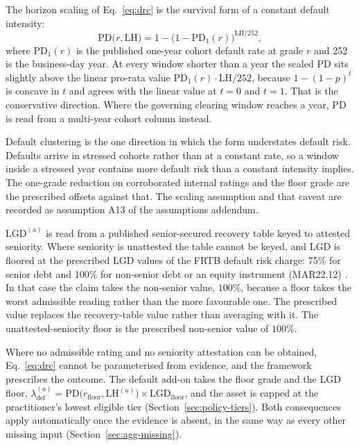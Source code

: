 The horizon scaling of Eq.~\eqref{eq:drc} is the survival form of a constant default intensity:
\begin{equation}\label{eq:pd-horizon}
\mathrm{PD}\bigl(r,\mathrm{LH}\bigr) = 1-\bigl(1-\mathrm{PD}_1(r)\bigr)^{\mathrm{LH}/252},
\end{equation}
where $\mathrm{PD}_1(r)$ is the published one-year cohort default rate at grade $r$ and 252 is the business-day year. At every window shorter than a year the scaled $\mathrm{PD}$ sits slightly above the linear pro-rata value $\mathrm{PD}_1(r)\cdot\mathrm{LH}/252$, because $1-(1-p)^t$ is concave in $t$ and agrees with the linear value at $t=0$ and $t=1$. That is the conservative direction. Where the governing clearing window reaches a year, $\mathrm{PD}$ is read from a multi-year cohort column instead.

Default clustering is the one direction in which the form understates default risk. Defaults arrive in stressed cohorts rather than at a constant rate, so a window inside a stressed year contains more default risk than a constant intensity implies. The one-grade reduction on corroborated internal ratings and the floor grade are the prescribed offsets against that. The scaling assumption and that caveat are recorded as assumption A13 of the assumptions addendum.

$\mathrm{LGD}^{(a)}$ is read from a published senior-secured recovery table keyed to attested seniority. Where seniority is unattested the table cannot be keyed, and LGD is floored at the prescribed LGD values of the FRTB default risk charge: 75\% for senior debt and 100\% for non-senior debt or an equity instrument (MAR22.12) \citep{bcbs_frtb_d457}. In that case the claim takes the non-senior value, $100\%$, because a floor
takes the worst admissible reading rather than the more favourable one. The prescribed value
replaces the recovery-table value rather than averaging with it. The unattested-seniority
floor is the prescribed non-senior value of $100\%$.

Where no admissible rating and no seniority attestation can be obtained, Eq.~\eqref{eq:drc} cannot be parameterised from evidence, and the framework prescribes the outcome. The default add-on takes the floor grade and the LGD floor, $\lambda^{(a)}_{\mathrm{def}} = \mathrm{PD}\bigl(r_{\mathrm{floor}},\mathrm{LH}^{(a)}\bigr)\times\mathrm{LGD}_{\mathrm{floor}}$, and the asset is capped at the practitioner's lowest eligible tier (Section~\ref{sec:policy-tiers}). Both consequences apply automatically once the evidence is absent, in the same way as every other missing input (Section~\ref{sec:agg-missing}).

